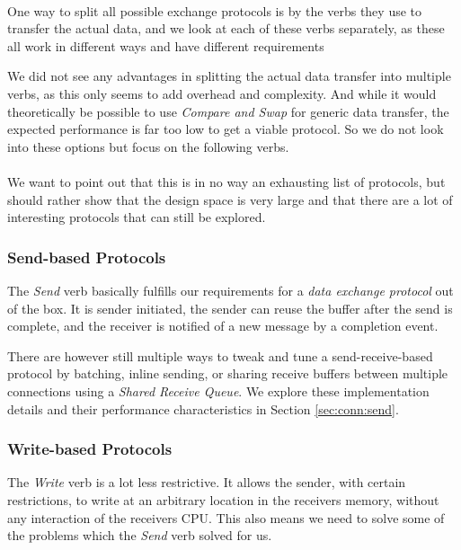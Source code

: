 \paragraph{} One way to split all possible exchange protocols is by the verbs they use to transfer the actual 
data, and we look at each of these verbs separately, as these all work in different ways and have different requirements

We did not see any advantages in splitting the actual data transfer into multiple verbs, as this only seems to add overhead 
and complexity. And while it would theoretically be possible to use \emph{Compare and Swap} for generic data transfer,
the expected performance is far too low to get a viable protocol. So we do not look into these options but focus on the 
following verbs.

\paragraph{} We want to point out that this is in no way an exhausting list of protocols, but should rather show that the 
design space is very large and that there are a lot of interesting protocols that can still be explored.

\subsubsection{Send-based Protocols}
The \emph{Send} verb basically fulfills our requirements for a \emph{data exchange protocol} out of the box. It is sender
initiated, the sender can reuse the buffer after the send is complete, and the receiver is notified of a new message by
a completion event.

There are however still multiple ways to tweak and tune a send-receive-based protocol by batching, inline sending, or 
sharing receive buffers between multiple connections using a \emph{Shared Receive Queue}. We explore these implementation 
details and their performance characteristics in Section \ref{sec:conn:send}.

\subsubsection{Write-based Protocols}
The \emph{Write} verb is a lot less restrictive. It allows the sender, with certain restrictions, to write at an arbitrary 
location in the receivers memory, without any interaction of the receivers CPU. This also means we need to solve some of the 
problems which the \emph{Send} verb solved for us.

